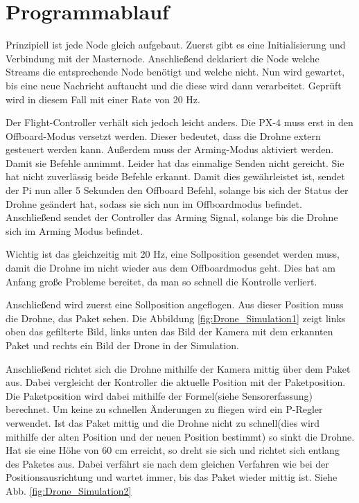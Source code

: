 \section{Programmablauf}
Prinzipiell ist jede Node gleich aufgebaut. Zuerst gibt es eine Initialisierung und Verbindung mit der Masternode. Anschließend deklariert die Node welche Streams die entsprechende Node benötigt und welche nicht. Nun wird gewartet, bis eine neue Nachricht auftaucht und die diese wird dann verarbeitet. Geprüft wird in diesem Fall mit einer Rate von 20 Hz. 

Der Flight-Controller verhält sich jedoch leicht anders. Die PX-4 muss erst in den Offboard-Modus versetzt werden. Dieser bedeutet, dass die Drohne extern gesteuert werden kann. Außerdem muss der Arming-Modus aktiviert werden. Damit sie Befehle annimmt. Leider hat das einmalige Senden nicht gereicht. Sie hat nicht zuverlässig beide Befehle erkannt. Damit dies gewährleistet ist, sendet der Pi nun aller 5 Sekunden den Offboard Befehl, solange bis sich der Status der Drohne geändert hat, sodass sie sich nun im Offboardmodus befindet. Anschließend sendet der Controller das Arming Signal, solange bis die Drohne sich im Arming Modus befindet.

Wichtig ist das gleichzeitig mit 20 Hz, eine Sollposition gesendet werden muss, damit die Drohne im nicht wieder aus dem Offboardmodus geht. Dies hat am Anfang große Probleme bereitet, da man so schnell die Kontrolle verliert.

Anschließend wird zuerst eine Sollposition angeflogen. Aus dieser Position muss die Drohne, das Paket sehen. Die Abbildung \ref{fig:Drone_Simulation1} zeigt links oben das gefilterte Bild, links unten das Bild der Kamera mit dem erkannten Paket und rechts ein Bild der Drone in der Simulation. 


 Anschließend richtet sich die Drohne mithilfe der Kamera mittig über dem Paket aus. Dabei vergleicht der Kontroller die aktuelle Position mit der Paketposition. Die Paketposition wird dabei mithilfe der Formel(siehe Sensorerfassung) berechnet. Um keine zu schnellen Änderungen zu fliegen wird ein P-Regler verwendet. Ist das Paket mittig und die Drohne nicht zu schnell(dies wird mithilfe der alten Position und der neuen Position bestimmt) so sinkt die Drohne. Hat sie eine Höhe von 60 cm erreicht, so dreht sie sich und richtet sich entlang des Paketes aus. Dabei verfährt sie nach dem gleichen Verfahren wie bei der Positionsausrichtung und wartet immer, bis das Paket wieder mittig ist. Siehe Abb. \ref{fig:Drone_Simulation2}

